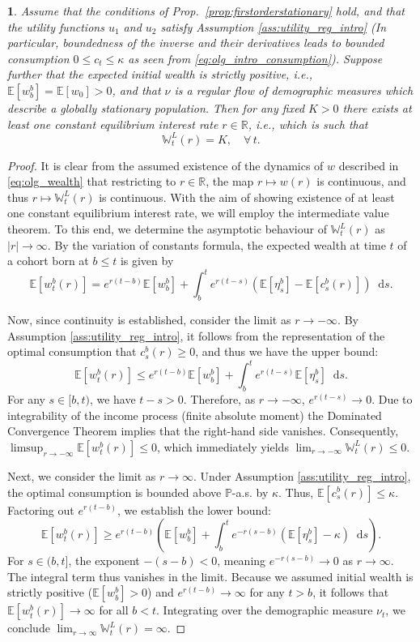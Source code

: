 \documentclass[11pt,oneside,english,reqno,dvipsnames,table]{amsart}
\numberwithin{equation}{section}
\theoremstyle{plain}
\newtheorem{thm}{\protect\theoremname}
\theoremstyle{definition}
\theoremstyle{remark}
\theoremstyle{plain}
\theoremstyle{plain}
\theoremstyle{plain}
\theoremstyle{plain}
\theoremstyle{plain}
\theoremstyle{plain}
\theoremstyle{plain}
\providecommand{\theoremname}{Theorem}
\newcommand{\blue}[1]{#1}
\newcommand{\RR}{\mathbb{R}}
\newcommand{\WW}{\mathbb{W}}
\newcommand{\dd}{\mathop{}\!\mathrm{d}}
\newcommand{\mbE}{\mathbb{E}}
\newcommand{\mbP}{\mathbb{P}}
\numberwithin{thm}{section}
\begin{document}
\blue{
\begin{thm}\label{th:olg_stationary_existence}
    Assume that the conditions of Prop.~\ref{prop:firstorderstationary} hold, and that the utility functions $u_1$ and $u_2$ satisfy Assumption \ref{ass:utility_reg_intro} (In particular, boundedness of the inverse and their derivatives leads to  bounded consumption $0\le c_t \le \kappa$ as seen from \eqref{eq:olg_intro_consumption}). Suppose further that the expected initial wealth is strictly positive, i.e., $\mbE[w_b^b] = \mbE[w_0] > 0$, and that $\nu$ is a regular flow of demographic measures which describe a globally stationary population. Then for any fixed $K> 0$ there exists at least one constant equilibrium interest rate $r\in \RR$, i.e., which is such that 
    \[ 
    \WW^L_t(r) = K,\quad \forall \,t. 
    \]
\end{thm}
\begin{proof}
    It is clear from the assumed existence of the dynamics of $w$ described in \eqref{eq:olg_wealth} that restricting to $r\in \RR$, the map $r\mapsto w(r)$ is continuous, and thus $r\mapsto \WW_t^L(r)$ is continuous. With the aim of showing existence of at least one constant equilibrium interest rate, we will employ the intermediate value theorem. To this end, we determine the asymptotic behaviour of $\WW_t^L(r)$ as $|r| \to \infty$. By the variation of constants formula, the expected wealth at time $t$ of a cohort born at $b \le t$ is given by
\[
\mbE[w_t^b(r)] = e^{r(t-b)}\mbE[w_b^b] + \int_b^t e^{r(t-s)}(\mbE[\eta_s^b] - \mbE[c_s^b(r)])\dd s.
\]

Now, since continuity is established, consider the limit as $r \rightarrow -\infty$. By Assumption \ref{ass:utility_reg_intro}, it follows from the representation of the optimal consumption that $c_s^b(r) \ge 0$, and thus we have the upper bound:
\[
\mbE[w_t^b(r)] \le e^{r(t-b)}\mbE[w_b^b] + \int_b^t e^{r(t-s)}\mbE[\eta_s^b]\dd s.
\]
For any $s \in [b, t)$, we have $t-s > 0$. Therefore, as $r \to -\infty$, $e^{r(t-s)} \to 0$. Due to integrability of the income process (finite absolute moment) the Dominated Convergence Theorem implies that the right-hand side vanishes. Consequently, $\limsup_{r\to -\infty} \mbE[w_t^b(r)] \le 0$, which immediately yields $\lim_{r\to -\infty} \WW^L_t(r)\leq 0$.

Next, we consider the limit as $r \rightarrow \infty$. Under Assumption \ref{ass:utility_reg_intro}, the optimal consumption is bounded above $\mbP$-a.s. by $\kappa$. Thus, $\mbE[c_s^b(r)] \le \kappa$. Factoring out $e^{r(t-b)}$, we establish the lower bound:
\[
\mbE[w_t^b(r)] \ge e^{r(t-b)}\left( \mbE[w_b^b] + \int_b^t e^{-r(s-b)}(\mbE[\eta_s^b] - \kappa)\dd s \right).
\]
For $s \in (b, t]$, the exponent $-(s-b) < 0$, meaning $e^{-r(s-b)} \to 0$ as $r \to \infty$. The integral term thus vanishes in the limit. Because we assumed initial wealth is strictly positive ($\mbE[w_b^b] > 0$) and $e^{r(t-b)} \to \infty$ for any $t > b$, it follows that $\mbE[w_t^b(r)] \to \infty$ for all $b < t$. Integrating over the demographic measure $\nu_t$, we conclude $\lim_{r\to \infty} \WW^L_t(r) = \infty$.


\end{proof}}
\end{document}
